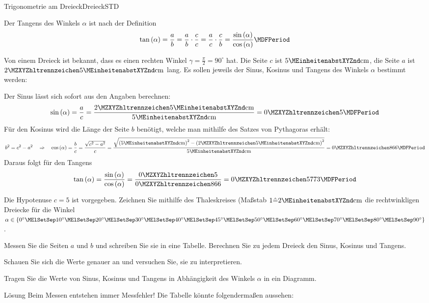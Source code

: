 \begin{MXContent}{Trigonometrie am Dreieck}{Dreieck}{STD}
\begin{MInfo}
\end{MInfo}

Der Tangens des Winkels $\alpha$ ist nach der Definition \[\tan\left(\alpha\right)=\frac{a}{b}=\frac{a}{b}\cdot\frac{c}{c}=\frac{a}{c}\cdot\frac{c}{b}=\frac{\sin\left(\alpha\right)}{\cos\left(\alpha\right)} \MDFPeriod\]

\begin{MExample}
Von einem Dreieck ist bekannt, dass es einen rechten Winkel $\gamma=\frac{\pi}{2}=90^\circ$ hat. Die Seite $c$ ist $5\MEinheit{cm}$, die Seite $a$ ist $\MZahl{2}{5}\MEinheit{cm}$ lang. Es sollen jeweils der Sinus, Kosinus und Tangens des Winkels $\alpha$ bestimmt werden:

Der Sinus l\"asst sich sofort aus den Angaben berechnen:
\[\sin\left(\alpha\right)=\frac{a}{c}=\frac{\MZahl{2}{5}\MEinheit{cm}}{5\MEinheit{cm}}=\MZahl{0}{5} \MDFPeriod\]
F\"ur den Kosinus wird die L\"ange der Seite $b$ ben\"otigt, welche man mithilfe des Satzes von Pythagoras erh\"alt:
\[b^2=c^2-a^2\quad\Rightarrow\quad\cos\left(\alpha\right)=\frac{b}{c}=\frac{\sqrt{c^2-a^2}}{c}=\frac{\sqrt{\left(5\MEinheit{cm}\right)^2-\left(\MZahl{2}{5}\MEinheit{cm}\right)^2}}{5\MEinheit{cm}}=\MZahl{0}{866} \MDFPeriod\]
Daraus folgt f\"ur den Tangens
\[\tan\left(\alpha\right)=\frac{\sin\left(\alpha\right)}{\cos\left(\alpha\right)}=\frac{\MZahl{0}{5}}{\MZahl{0}{866}}=\MZahl{0}{5773} \MDFPeriod\]
\end{MExample}


\begin{MExercise}
Die Hypotenuse $c=5$ ist vorgegeben. Zeichnen Sie mithilfe des Thaleskreises (Ma\ss stab $ 1\hat{=}2\MEinheit{cm}$
die rechtwinkligen Dreiecke f\"ur die Winkel $\alpha\in\left\{0^\circ\MElSetSep 10^\circ\MElSetSep 20^\circ\MElSetSep 30^\circ\MElSetSep 40^\circ\MElSetSep 45^\circ\MElSetSep
50^\circ\MElSetSep 60^\circ\MElSetSep 70^\circ\MElSetSep 80^\circ\MElSetSep 90^\circ\right\}$.

Messen Sie die Seiten $a$ und $b$ und schreiben Sie sie in eine Tabelle. Berechnen Sie zu jedem Dreieck den Sinus, Kosinus und Tangens.

Schauen Sie sich die Werte genauer an und versuchen Sie, sie zu interpretieren.

Tragen Sie die Werte von Sinus, Kosinus und Tangens in Abh\"angigkeit des Winkels $\alpha$ in ein Diagramm.

\begin{MHint}{L\"osung}
Beim Messen entstehen immer Messfehler!
Die Tabelle k\"onnte folgenderma\ss en aussehen:


\end{MHint}
\end{MExercise}
\end{MXContent}
